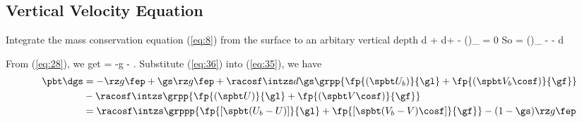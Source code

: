 \subsection{Vertical Velocity Equation}
\label{der:sig-w}

Integrate the mass conservation equation (\ref{eq:8}) from the surface to an
arbitary vertical depth
\beeq
\intzs \grpp{ \pppt+\racosf\ppupl+\racosf\ppvcpf+\ppsps }d
\eneq
\beeq 
\pppt \gs + \racosf \intzs \grpp{ \ppupl + \ppvcpf }d\gs + 
\pbt \dgs - (\pbt\dgs)_{} = 0
\eneq
So
\beeq \label{eq:35}
\pbt\dgs = (\pbt\dgs)_{} - \gs\pppt - \racosf\intzs\grpp{ \ppupl + \ppvcpf }d\gs
\eneq

From (\ref{eq:28}), we get
\beeq \label{eq:36}
\pppt = -\rz g \fep - \racosf {}.
\eneq
Substitute (\ref{eq:36}) into (\ref{eq:35}), we have
\begin{align}
  \pbt\dgs &= -\rz g \fep + \gs\rz g\fep + \racosf\intzs d\gs
  \grpp{ \fp{(\spbt U_b)}{\gl} + \fp{(\spbt V_b\cosf)}{\gf} } \notag\\
  &-\racosf\intzs \grpp{ \fp{(\spbt U)}{\gl} + \fp{(\spbt V\cosf)}{\gf} }\notag\\
  &=\racosf\intzs\grppp{ \fp{[\spbt (U_b-U)]}{\gl} + \fp{[\spbt
  (V_b-V)\cosf]}{\gf} } -(1-\gs)\rz g\fep
\end{align}

